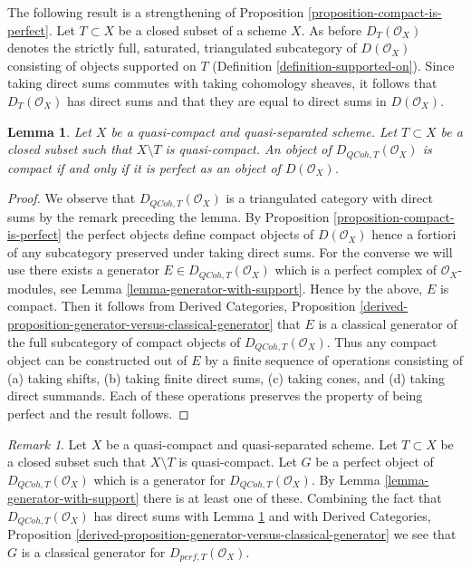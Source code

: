 \documentclass{stacks-project}
\theoremstyle{plain}
\newtheorem{lemma}[subsection]{Lemma}
\theoremstyle{definition}
\theoremstyle{remark}
\newtheorem{remark}[subsection]{Remark}
\numberwithin{equation}{subsection}
\def\QCoh{\mathit{QCoh}}
\begin{document}
\noindent
The following result is a strengthening of
Proposition \ref{proposition-compact-is-perfect}.
Let $T \subset X$ be a closed subset of a scheme $X$. As before
$D_T(\mathcal{O}_X)$ denotes the strictly full, saturated,
triangulated subcategory of $D(\mathcal{O}_X)$ consisting of objects
supported on $T$ (Definition \ref{definition-supported-on}).
Since taking direct sums commutes with taking cohomology sheaves, it follows
that $D_T(\mathcal{O}_X)$ has direct sums and that they are equal
to direct sums in $D(\mathcal{O}_X)$.

\begin{lemma}
\label{lemma-compact-is-perfect-with-support}
Let $X$ be a quasi-compact and quasi-separated scheme.
Let $T \subset X$ be a closed subset such that $X \setminus T$
is quasi-compact. An object of $D_{\QCoh, T}(\mathcal{O}_X)$ is compact
if and only if it is perfect as an object of $D(\mathcal{O}_X)$.
\end{lemma}

\begin{proof}
We observe that $D_{\QCoh, T}(\mathcal{O}_X)$ is a triangulated
category with direct sums by the remark preceding the lemma.
By Proposition \ref{proposition-compact-is-perfect}
the perfect objects define compact objects of $D(\mathcal{O}_X)$
hence a fortiori of any subcategory preserved under taking direct
sums. For the converse we will use there exists a generator
$E \in D_{\QCoh, T}(\mathcal{O}_X)$ which is a perfect complex
of $\mathcal{O}_X$-modules, see
Lemma \ref{lemma-generator-with-support}.
Hence by the above, $E$ is compact. Then it follows from
Derived Categories, Proposition
\ref{derived-proposition-generator-versus-classical-generator}
that $E$ is a classical generator of the full subcategory
of compact objects of $D_{\QCoh, T}(\mathcal{O}_X)$.
Thus any compact object can be constructed out of $E$ by
a finite sequence of operations consisting of
(a) taking shifts, (b) taking finite direct sums, (c) taking cones, and
(d) taking direct summands. Each of these operations preserves
the property of being perfect and the result follows.
\end{proof}

\begin{remark}
\label{remark-classical-generator-with-support}
Let $X$ be a quasi-compact and quasi-separated scheme.
Let $T \subset X$ be a closed subset such that $X \setminus T$
is quasi-compact. Let $G$ be a
perfect object of $D_{\QCoh, T}(\mathcal{O}_X)$ which is a generator for
$D_{\QCoh, T}(\mathcal{O}_X)$. By Lemma \ref{lemma-generator-with-support}
there is at least one of these. Combining the fact that
$D_{\QCoh, T}(\mathcal{O}_X)$ has direct sums with
Lemma \ref{lemma-compact-is-perfect-with-support} and with
Derived Categories, Proposition
\ref{derived-proposition-generator-versus-classical-generator}
we see that $G$ is a classical generator for $D_{perf, T}(\mathcal{O}_X)$.
\end{remark}
\end{document}
